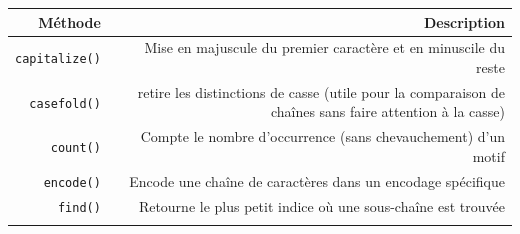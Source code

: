 \documentclass[12pt,]{book}
\numberwithin{equation}{section}
\numberwithin{countremarque}{section}
\begin{document}
\begin{longtable}[]{@{}rr@{}}
\toprule
\begin{minipage}[b]{0.15\columnwidth}\raggedleft\strut
Méthode\strut
\end{minipage} & \begin{minipage}[b]{0.79\columnwidth}\raggedleft\strut
Description\strut
\end{minipage}\tabularnewline
\midrule
\endhead
\begin{minipage}[t]{0.15\columnwidth}\raggedleft\strut
\texttt{capitalize()}\strut
\end{minipage} & \begin{minipage}[t]{0.79\columnwidth}\raggedleft\strut
Mise en majuscule du premier caractère et en minuscile du reste\strut
\end{minipage}\tabularnewline
\begin{minipage}[t]{0.15\columnwidth}\raggedleft\strut
\texttt{casefold()}\strut
\end{minipage} & \begin{minipage}[t]{0.79\columnwidth}\raggedleft\strut
retire les distinctions de casse (utile pour la comparaison de chaînes
sans faire attention à la casse)\strut
\end{minipage}\tabularnewline
\begin{minipage}[t]{0.15\columnwidth}\raggedleft\strut
\texttt{count()}\strut
\end{minipage} & \begin{minipage}[t]{0.79\columnwidth}\raggedleft\strut
Compte le nombre d'occurrence (sans chevauchement) d'un motif\strut
\end{minipage}\tabularnewline
\begin{minipage}[t]{0.15\columnwidth}\raggedleft\strut
\texttt{encode()}\strut
\end{minipage} & \begin{minipage}[t]{0.79\columnwidth}\raggedleft\strut
Encode une chaîne de caractères dans un encodage spécifique\strut
\end{minipage}\tabularnewline
\begin{minipage}[t]{0.15\columnwidth}\raggedleft\strut
\texttt{find()}\strut
\end{minipage} & \begin{minipage}[t]{0.79\columnwidth}\raggedleft\strut
Retourne le plus petit indice où une sous-chaîne est trouvée\strut
\end{minipage}\tabularnewline
\begin{minipage}[t]{0.15\columnwidth}\raggedleft\strut

\end{minipage}
\end{longtable}
\end{document}

